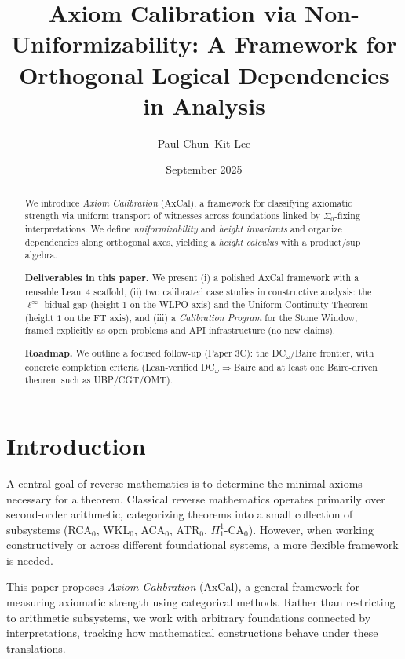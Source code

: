 \documentclass[11pt]{article}
\title{Axiom Calibration via Non-Uniformizability: A Framework for Orthogonal Logical Dependencies in Analysis}
\author{Paul Chun--Kit Lee}
\date{September 2025}
\newcommand{\SigmaZero}{\Sigma_{0}}
\begin{document}
\maketitle

\begin{abstract}
We introduce \emph{Axiom Calibration} (AxCal), a framework for classifying axiomatic strength via uniform transport of witnesses across foundations linked by $\SigmaZero$-fixing interpretations. We define \emph{uniformizability} and \emph{height invariants} and organize dependencies along orthogonal axes, yielding a \emph{height calculus} with a product/sup algebra.

\smallskip
\noindent \textbf{Deliverables in this paper.} We present (i) a polished AxCal framework with a reusable Lean~4 scaffold, (ii) two calibrated case studies in constructive analysis: the $\ell^\infty$ bidual gap (height $1$ on the WLPO axis) and the Uniform Continuity Theorem (height $1$ on the FT axis), and (iii) a \emph{Calibration Program} for the Stone Window, framed explicitly as open problems and API infrastructure (no new claims).

\smallskip
\noindent \textbf{Roadmap.} We outline a focused follow-up (Paper 3C): the DC$_\omega$/Baire frontier, with concrete completion criteria (Lean-verified DC$_\omega\Rightarrow$Baire and at least one Baire-driven theorem such as UBP/CGT/OMT).
\end{abstract}

\tableofcontents

\section{Introduction}

A central goal of reverse mathematics is to determine the minimal axioms necessary for a theorem. Classical reverse mathematics operates primarily over second-order arithmetic, categorizing theorems into a small collection of subsystems (RCA$_0$, WKL$_0$, ACA$_0$, ATR$_0$, $\Pi^1_1$-CA$_0$). However, when working constructively or across different foundational systems, a more flexible framework is needed.

This paper proposes \emph{Axiom Calibration} (AxCal), a general framework for measuring axiomatic strength using categorical methods. Rather than restricting to arithmetic subsystems, we work with arbitrary foundations connected by interpretations, tracking how mathematical constructions behave under these translations.
\end{document}
